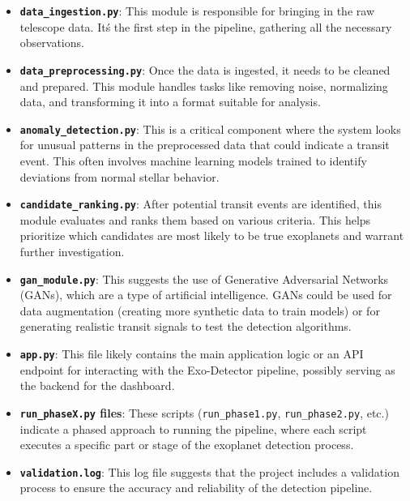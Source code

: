 \documentclass{article}
\begin{document}
\begin{itemize}
    \item \textbf{\texttt{data\_ingestion.py}}: This module is responsible for bringing in the raw telescope data. It\'s the first step in the pipeline, gathering all the necessary observations.

    \item \textbf{\texttt{data\_preprocessing.py}}: Once the data is ingested, it needs to be cleaned and prepared. This module handles tasks like removing noise, normalizing data, and transforming it into a format suitable for analysis.

    \item \textbf{\texttt{anomaly\_detection.py}}: This is a critical component where the system looks for unusual patterns in the preprocessed data that could indicate a transit event. This often involves machine learning models trained to identify deviations from normal stellar behavior.

    \item \textbf{\texttt{candidate\_ranking.py}}: After potential transit events are identified, this module evaluates and ranks them based on various criteria. This helps prioritize which candidates are most likely to be true exoplanets and warrant further investigation.

    \item \textbf{\texttt{gan\_module.py}}: This suggests the use of Generative Adversarial Networks (GANs), which are a type of artificial intelligence. GANs could be used for data augmentation (creating more synthetic data to train models) or for generating realistic transit signals to test the detection algorithms.

    \item \textbf{\texttt{app.py}}: This file likely contains the main application logic or an API endpoint for interacting with the Exo-Detector pipeline, possibly serving as the backend for the dashboard.

    \item \textbf{\texttt{run\_phaseX.py} files}: These scripts (\texttt{run\_phase1.py}, \texttt{run\_phase2.py}, etc.) indicate a phased approach to running the pipeline, where each script executes a specific part or stage of the exoplanet detection process.

    \item \textbf{\texttt{validation.log}}: This log file suggests that the project includes a validation process to ensure the accuracy and reliability of the detection pipeline.
\end{itemize}
\end{document}
